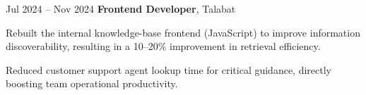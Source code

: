 \begin{twocolentry}{
            Jul 2024 – Nov 2024
        }
\textbf{Frontend Developer}, Talabat\end{twocolentry}

\vspace{0.10 cm}
\begin{onecolentry}
    \begin{highlights}
        \item Rebuilt the internal knowledge-base frontend (JavaScript) to improve information discoverability, resulting in a 10--20\% improvement in retrieval efficiency.
        \item Reduced customer support agent lookup time for critical guidance, directly boosting team operational productivity.
    \end{highlights}
\end{onecolentry}